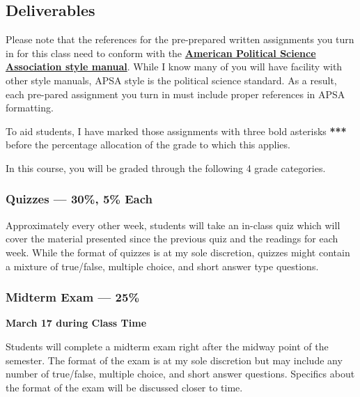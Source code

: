 \documentclass[12pt]{article}
\begin{document}
\subsection*{Deliverables}
\par{Please note that the references for the pre-prepared written assignments you turn in for this class need to conform with the \textbf{\href{https://connect.apsanet.org/stylemanual/}{American Political Science Association style manual}}. While I know many of you will have facility with other style manuals, APSA style is the political science standard. As a result, each pre-pared assignment you turn in must include proper references in APSA formatting.

To aid students, I have marked those assignments with three bold asterisks \textbf{***} before the percentage allocation of the grade to which this applies.}

\par{In this course, you will be graded through the following 4 grade categories.}

\subsubsection*{Quizzes --- 30\%, 5\% Each}
\par{Approximately every other week, students will take an in-class quiz which will cover the material presented since the previous quiz and the readings for each week. While the format of quizzes is at my sole discretion, quizzes might contain a mixture of true/false, multiple choice, and short answer type questions.}

\subsubsection*{Midterm Exam --- 25\%}
\textbf{March 17 during Class Time}
\par{Students will complete a midterm exam right after the midway point of the semester. The format of the exam is at my sole discretion but may include any number of true/false, multiple choice, and short answer questions. Specifics about the format of the exam will be discussed closer to time.}
\end{document}

